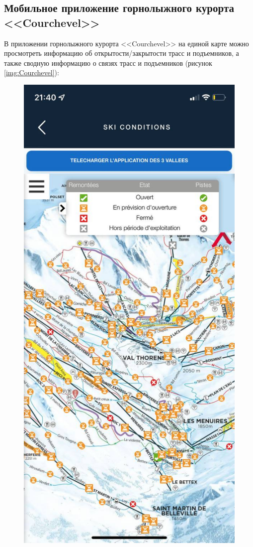 \clearpage
\subsection{Мобильное приложение горнолыжного курорта <<Courchevel>>}

В приложении горнолыжного курорта <<Courchevel>> на единой карте можно просмотреть информацию об открытости/закрытости трасс и подъемников, а также сводную информацию о связях трасс и подъемников (рисунок \ref{img:Courchevel}):


\begin{figure}[h!]
	\begin{center}
		\includegraphics[scale=0.35]{../imgs/analogue_apps/Courchevel.png}

\end{center}
\end{figure}
